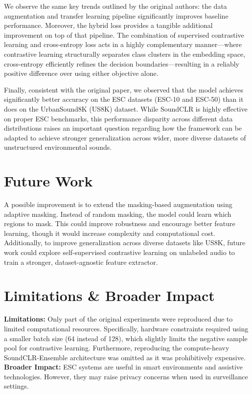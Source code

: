 \documentclass[twocolumn, 10pt]{article}
\begin{document}
We observe the same key trends outlined by the original authors: the data augmentation and transfer learning pipeline significantly improves baseline performance. Moreover, the hybrid loss provides a tangible additional improvement on top of that pipeline. The combination of supervised contrastive learning and cross-entropy loss acts in a highly complementary manner---where contrastive learning structurally separates class clusters in the embedding space, cross-entropy efficiently refines the decision boundaries---resulting in a reliably positive difference over using either objective alone.

Finally, consistent with the original paper, we observed that the model achieves significantly better accuracy on the ESC datasets (ESC-10 and ESC-50) than it does on the UrbanSound8K (US8K) dataset. While SoundCLR is highly effective on proper ESC benchmarks, this performance disparity across different data distributions raises an important question regarding how the framework can be adapted to achieve stronger generalization across wider, more diverse datasets of unstructured environmental sounds.

\section{Future Work}
A possible improvement is to extend the masking-based augmentation using adaptive masking. Instead of random masking, the model could learn which regions to mask. This could improve robustness and encourage better feature learning, though it would increase complexity and computational cost. Additionally, to improve generalization across diverse datasets like US8K, future work could explore self-supervised contrastive learning on unlabeled audio to train a stronger, dataset-agnostic feature extractor.

\section{Limitations \& Broader Impact}
\textbf{Limitations:} Only part of the original experiments were reproduced due to limited computational resources. Specifically, hardware constraints required using a smaller batch size (64 instead of 128), which slightly limits the negative sample pool for contrastive learning. Furthermore, reproducing the compute-heavy SoundCLR-Ensemble architecture was omitted as it was prohibitively expensive.
\textbf{Broader Impact:} ESC systems are useful in smart environments and assistive technologies. However, they may raise privacy concerns when used in surveillance settings.
\end{document}
